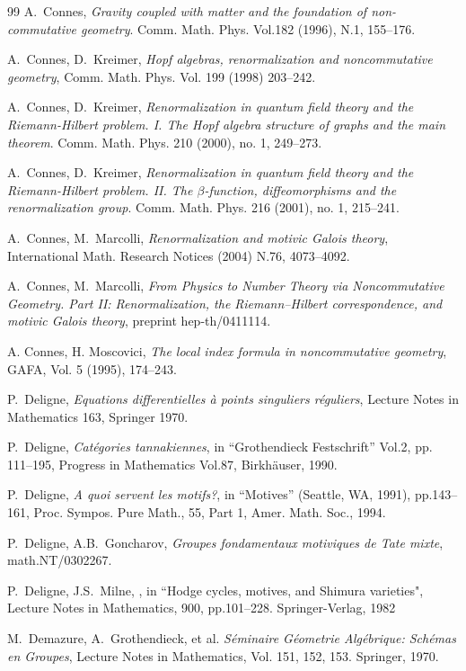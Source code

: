\documentclass[10pt]{amsart}
\numberwithin{equation}{section}
\begin{document}
\begin{thebibliography}{99}
 A.~Connes, {\em Gravity coupled with matter and the
foundation of non-commutative geometry}.  Comm. Math. Phys.
Vol.182 (1996),  N.1, 155--176.

 A.~Connes, D.~Kreimer, {\it Hopf algebras,
renormalization and noncommutative geometry},
Comm. Math. Phys. Vol. 199 (1998) 203--242.

 A.~Connes, D.~Kreimer, {\it Renormalization in quantum
   field theory and the Riemann-Hilbert problem. I. The Hopf algebra
   structure of graphs and the main theorem}. Comm. Math. Phys. 210 (2000),
   no. 1, 249--273.

 A.~Connes, D.~Kreimer, {\it Renormalization in quantum
   field theory and the Riemann-Hilbert problem. II. The $\beta$-function,
   diffeomorphisms and the renormalization group}. Comm. Math. Phys. 216
   (2001), no. 1, 215--241.

 A.~Connes, M.~Marcolli, {\em Renormalization and
motivic Galois theory}, International Math. Research Notices (2004) N.76,
4073--4092.

 A.~Connes, M.~Marcolli, {\em From Physics to Number
Theory via Noncommutative Geometry. Part II: Renormalization, the
Riemann--Hilbert correspondence, and motivic Galois theory}, preprint
hep-th/0411114.

  A. Connes, H. Moscovici, {\em
 The local index formula in noncommutative
geometry},  GAFA, Vol. 5 (1995), 174--243.

 P.~Deligne, {\em Equations differentielles \`a points
 singuliers r\'eguliers}, Lecture Notes in Mathematics 163,
 Springer 1970.

 P.~Deligne, {\em Cat\'egories tannakiennes}, in
``Grothendieck Festschrift'' Vol.2, pp. 111--195, Progress in
Mathematics Vol.87, Birkh\"auser, 1990.

 P.~Deligne, {\em  A quoi servent les motifs?}, in
``Motives'' (Seattle, WA, 1991), pp.143--161,
Proc. Sympos. Pure Math., 55, Part 1, Amer. Math. Soc., 1994.

   P.~Deligne, A.B.~Goncharov,
       {\em  Groupes fondamentaux motiviques de Tate mixte},
math.NT/0302267.

 P.~Deligne, J.S.~Milne, {\em }, in ``Hodge cycles,
motives, and Shimura varieties", Lecture Notes in Mathematics, 900,
pp.101--228. Springer-Verlag, 1982

 M.~Demazure, A.~Grothendieck, et al. {\em S\'eminaire
G\'eometrie Alg\'ebrique: Sch\'emas en Groupes}, Lecture Notes
in Mathematics, Vol. 151, 152, 153. Springer, 1970.


\end{thebibliography}
\end{document}
